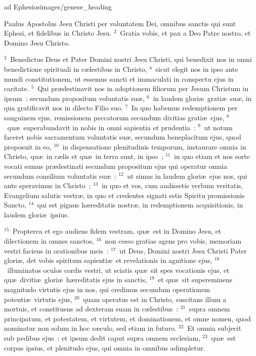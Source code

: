 {ad Ephesios}{images/genese_heading}


\lettrine[lines=6,image=true,loversize=0.05,lraise=-0.03]{P}{}aulus Apostolus Jesu Christi per voluntatem Dei, omnibus sanctis qui sunt Ephesi, et fidelibus in Christo Jesu.
${}^{2}$~Gratia vobis, et pax a Deo Patre nostro, et Domino Jesu Christo.


${}^{3}$~Benedictus Deus et Pater Domini nostri Jesu Christi, qui benedixit nos in omni benedictione spirituali in c\ae lestibus in Christo,
${}^{4}$~sicut elegit nos in ipso ante mundi constitutionem, ut essemus sancti et immaculati in conspectu ejus in caritate.
${}^{5}$~Qui pr\ae destinavit nos in adoptionem filiorum per Jesum Christum in ipsum~: secundum propositum voluntatis su\ae ,
${}^{6}$~in laudem glori\ae\ grati\ae\ su\ae , in qua gratificavit nos in dilecto Filio suo.
${}^{7}$~In quo habemus redemptionem per sanguinem ejus, remissionem peccatorum secundum divitias grati\ae\ ejus,
${}^{8}$~qu\ae\ superabundavit in nobis in omni sapientia et prudentia~:
${}^{9}$~ut notum faceret nobis sacramentum voluntatis su\ae , secundum beneplacitum ejus, quod proposuit in eo,
${}^{10}$~in dispensatione plenitudinis temporum, instaurare omnia in Christo, qu\ae\ in c\ae lis et qu\ae\ in terra sunt, in ipso~;
${}^{11}$~in quo etiam et nos sorte vocati sumus pr\ae destinati secundum propositum ejus qui operatur omnia secundum consilium voluntatis su\ae~:
${}^{12}$~ut simus in laudem glori\ae\ ejus nos, qui ante speravimus in Christo~;
${}^{13}$~in quo et vos, cum audissetis verbum veritatis, Evangelium salutis vestr\ae , in quo et credentes signati estis Spiritu promissionis Sancto,
${}^{14}$~qui est pignus h\ae reditatis nostr\ae , in redemptionem acquisitionis, in laudem glori\ae\ ipsius.


${}^{15}$~Propterea et ego audiens fidem vestram, qu\ae\ est in Domino Jesu, et dilectionem in omnes sanctos,
${}^{16}$~non cesso gratias agens pro vobis, memoriam vestri faciens in orationibus meis~:
${}^{17}$~ut Deus, Domini nostri Jesu Christi Pater glori\ae , det vobis spiritum sapienti\ae\ et revelationis in agnitione ejus,
${}^{18}$~illuminatos oculos cordis vestri, ut sciatis qu\ae\ sit spes vocationis ejus, et qu\ae\ diviti\ae\ glori\ae\ h\ae reditatis ejus in sanctis,
${}^{19}$~et qu\ae\ sit supereminens magnitudo virtutis ejus in nos, qui credimus secundum operationem potenti\ae\ virtutis ejus,
${}^{20}$~quam operatus est in Christo, suscitans illum a mortuis, et constituens ad dexteram suam in c\ae lestibus~:
${}^{21}$~supra omnem principatum, et potestatem, et virtutem, et dominationem, et omne nomen, quod nominatur non solum in hoc s\ae culo, sed etiam in futuro.
${}^{22}$~Et omnia subjecit sub pedibus ejus~: et ipsum dedit caput supra omnem ecclesiam,
${}^{23}$~qu\ae\ est corpus ipsius, et plenitudo ejus, qui omnia in omnibus adimpletur.


